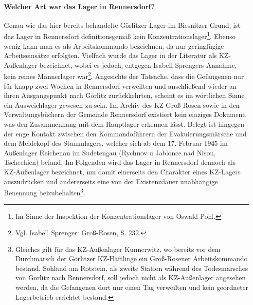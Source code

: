 \paragraph{Welcher Art war das Lager in Rennersdorf?} Genau wie das hier bereits behandelte Görlitzer Lager im Biesnitzer Grund, ist das Lager in Rennersdorf definitionsgemäß kein Konzentrationslager\footnote{Im Sinne der Inspektion der Konzentrationslager von Oswald Pohl.}. Ebenso wenig kann man es als Arbeitskommando bezeichnen, da nur geringfügige Arbeitseinsätze erfolgten. 
Vielfach wurde das Lager in der Literatur als KZ-Außenlager bezeichnet, wobei es jedoch, entgegen Isabell Sprengers Annahme, kein reines Männerlager war\footnote{Vgl. Isabell Sprenger: Groß-Rosen, S. 232.}. Angesichts der Tatsache, dass die Gefangenen nur für knapp zwei Wochen in Rennersdorf verweilten und anschließend wieder an ihren Ausgangspunkt nach Görlitz zurückkehrten, scheint es im wörtlichen Sinne ein Ausweichlager gewesen zu sein. Im Archiv des KZ Groß-Rosen sowie in den Verwaltungsbüchern der Gemeinde Rennersdorf existiert kein einziges Dokument, was den Zusammenhang mit dem Hauptlager erkennen lässt. Belegt ist hingegen der enge Kontakt zwischen den Kommandoführern der Evakuierungsmärsche und dem Meldekopf des Stammlagers, welcher sich ab dem 17. Februar 1945 im Außenlager Reichenau im Sudetengau (Rychnov u Jablonce nad Nisou, Tschechien) befand. 
Im Folgenden wird das Lager in Rennersdorf dennoch als KZ-Außenlager bezeichnet, um damit einerseits den Charakter eines KZ-Lagers auszudrücken und andererseits eine von der Existenzdauer unabhängige Benennung beizubehalten\footnote{Gleiches gilt für das KZ-Außenlager Kunnerwitz, wo bereits vor dem Durchmarsch der Görlitzer KZ-Häftlinge ein Groß-Rosener Arbeitskommando bestand. Sohland am Rotstein, als zweite Station während des Todesmarsches von Görlitz nach Rennersdorf, soll jedoch nicht als KZ-Außenlager angesehen werden, da die Gefangenen dort nur einen Tag verweilten und kein geordneter Lagerbetrieb errichtet bestand.}. 




